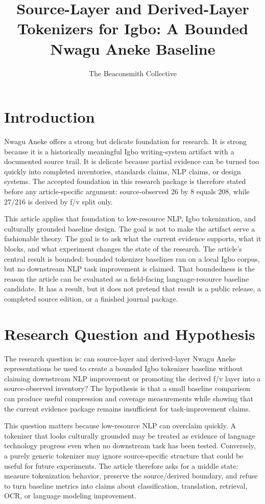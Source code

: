 \documentclass[sigconf,nonacm]{acmart}
\title{Source-Layer and Derived-Layer Tokenizers for Igbo: A Bounded Nwagu Aneke Baseline}
\author{The Beaconsmith Collective}
\affiliation{\institution{Etisiobi Research Studio}\city{Enugu}\country{Nigeria}}
\begin{document}
\maketitle

\section{Introduction}
Nwagu Aneke offers a strong but delicate foundation for research. It is strong
because it is a historically meaningful Igbo writing-system artifact with a
documented source trail. It is delicate because partial evidence can be turned
too quickly into completed inventories, standards claims, NLP claims, or design
systems. The accepted foundation in this research package is therefore stated
before any article-specific argument: source-observed 26 by 8 equals 208, while
27/216 is derived by f/v split only.

This article applies that foundation to low-resource NLP, Igbo tokenization, and culturally grounded baseline design. The goal is not to make the
artifact serve a fashionable theory. The goal is to ask what the current
evidence supports, what it blocks, and what experiment changes the state of the
research. The article's central result is bounded: bounded tokenizer baselines ran on a local Igbo corpus, but no downstream NLP task improvement is claimed. That boundedness is
the reason the article can be evaluated as a field-facing language-resource
baseline candidate. It has a result, but it does not pretend that result is a
public release, a completed source edition, or a finished journal package.

\section{Research Question and Hypothesis}
The research question is: can source-layer and derived-layer Nwagu Aneke
representations be used to create a bounded Igbo tokenizer baseline without
claiming downstream NLP improvement or promoting the derived f/v layer into a
source-observed inventory? The hypothesis is that a small baseline comparison
can produce useful compression and coverage measurements while showing that the
current evidence package remains insufficient for task-improvement claims.

This question matters because low-resource NLP can overclaim quickly. A
tokenizer that looks culturally grounded may be treated as evidence of language
technology progress even when no downstream task has been tested. Conversely, a
purely generic tokenizer may ignore source-specific structure that could be
useful for future experiments. The article therefore asks for a middle state:
measure tokenization behavior, preserve the source/derived boundary, and refuse
to turn baseline metrics into claims about classification, translation,
retrieval, OCR, or language modeling improvement.
\end{document}
